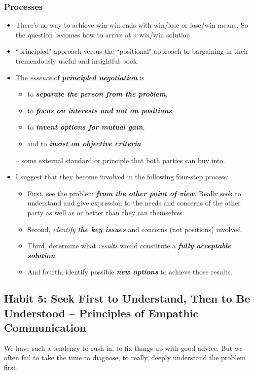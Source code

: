 \documentclass[11pt]{article}
\begin{document}
\subsubsection{Processes}
\begin{itemize}
\item There's no way to achieve win-win ends with win/lose or lose/win means. So the question becomes how to arrive at a win/win solution.

\item ``principled" approach versus the ``positional" approach to bargaining in their tremendously useful and insightful book.

\item The \emph{essence} of \emph{\textbf{principled negotiation}} is
\begin{itemize}
\item to \emph{\textbf{separate the person from the problem}},
\item to \emph{\textbf{focus on interests and not on positions}}, 
\item to \emph{\textbf{invent options for mutual gain}}, 
\item and to \emph{\textbf{insist on objective criteria}}
\end{itemize}
 --  some external standard or principle that both parties can buy into.
 
 \item I suggest that they become involved in the following four-step process:
 \begin{itemize}
 \item First, see the problem \emph{\textbf{from the other point of view}}. Really seek to understand and give expression to the needs and concerns of the other party as well as or better than they can themselves. 
 \item Second, \emph{identify \textbf{the key issues}} and concerns (not positions) involved. 
 \item Third, determine what \emph{results} would constitute a \emph{\textbf{fully acceptable solution}}.
 \item And fourth, identify possible \emph{\textbf{new options}} to achieve those results.
 \end{itemize}
\end{itemize}
\subsection{Habit 5: Seek First to Understand, Then to Be Understood -- Principles of Empathic Communication}
We have such a tendency to rush in, to fix things up with good advice. But we often fail to take the time to diagnose, to really, deeply understand the problem first.
\end{document}

